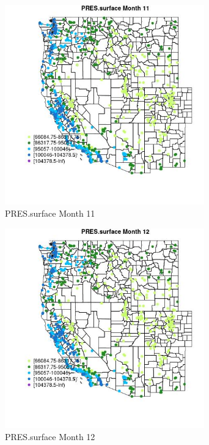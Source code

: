 \begin{figure} 
\centering  
\includegraphics[width=0.77\textwidth]{Code_Outputs/Report_ML_input_PM25_Step4_part_f_de_duplicated_aves_prioritize_24hr_obswNAs_MapObsMo11PRESsurface.jpg} 
\caption{\label{fig:Report_ML_input_PM25_Step4_part_f_de_duplicated_aves_prioritize_24hr_obswNAsMapObsMo11PRESsurface}PRES.surface Month 11} 
\end{figure} 
 

\begin{figure} 
\centering  
\includegraphics[width=0.77\textwidth]{Code_Outputs/Report_ML_input_PM25_Step4_part_f_de_duplicated_aves_prioritize_24hr_obswNAs_MapObsMo12PRESsurface.jpg} 
\caption{\label{fig:Report_ML_input_PM25_Step4_part_f_de_duplicated_aves_prioritize_24hr_obswNAsMapObsMo12PRESsurface}PRES.surface Month 12} 
\end{figure} 
 

